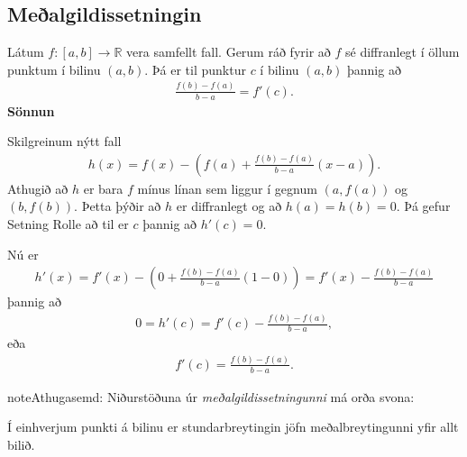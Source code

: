 \documentclass[b5paper,11pt,icelandic]{sphinxmanual}
\begin{document}

\subsection{Meðalgildissetningin}
\label{kafli03:id13}\label{kafli03:index-7}
Látum \(f:[a,b]\rightarrow{{\mathbb  R}}\) vera samfellt fall. Gerum
ráð fyrir að \(f\) sé diffranlegt í öllum punktum í bilinu
\((a,b)\). Þá er til punktur \(c\) í bilinu \((a,b)\) þannig
að
\begin{equation*}
\begin{split}\frac{f(b)-f(a)}{b-a}=f'(c).\end{split}
\end{equation*}
\textbf{Sönnun}

Skilgreinum nýtt fall
\begin{equation*}
\begin{split}h(x)=f(x)-\left(f(a)+ \frac{f(b)-f(a)}{b-a}(x-a)\right).\end{split}
\end{equation*}
Athugið að \(h\) er bara \(f\) mínus línan sem liggur í gegnum
\((a,f(a))\) og \((b,f(b))\). Þetta þýðir að \(h\) er diffranlegt
og að \(h(a)=h(b)=0\). Þá gefur Setning Rolle að til er \(c\) þannig að
\(h'(c)=0\).

Nú er
\begin{equation*}
\begin{split}h'(x) = f'(x) - \left(0+\frac{f(b)-f(a)}{b-a}(1-0)\right)
= f'(x) - \frac{f(b)-f(a)}{b-a}\end{split}
\end{equation*}
þannig að
\begin{equation*}
\begin{split}0 = h'(c) = f'(c) - \frac{f(b)-f(a)}{b-a},\end{split}
\end{equation*}
eða
\begin{equation*}
\begin{split}f'(c) = \frac{f(b)-f(a)}{b-a}.\end{split}
\end{equation*}
\begin{notice}{note}{Athugasemd:}
Niðurstöðuna úr \textit{meðalgildissetningunni} má orða svona:

Í einhverjum punkti á bilinu er stundarbreytingin jöfn meðalbreytingunni
yfir allt bilið.
\end{notice}

\end{document}
